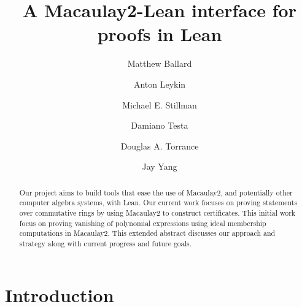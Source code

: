 \documentclass[runningheads]{llncs}
\begin{document}
%
\title{A Macaulay2-Lean interface for proofs in Lean}
%
%
\author{
  Matthew Ballard \and
  Anton Leykin \and
  Michael E. Stillman \and
  Damiano Testa \and
  Douglas A. Torrance \and
  Jay Yang
  }
%
%
%
\maketitle              %
%
\begin{abstract}

  Our project aims to build tools that ease the use of Macaulay2, and potentially other computer algebra systems, with Lean.
  Our current work focuses on proving statements over commutative rings by using Macaulay2 to construct certificates.
  This initial work focus on proving vanishing of polynomial expressions using ideal membership computations in Macaulay2.
  This extended abstract discusses our approach and strategy along with current progress and future goals.

\end{abstract}
%
%
%

\section{Introduction}
\end{document}
